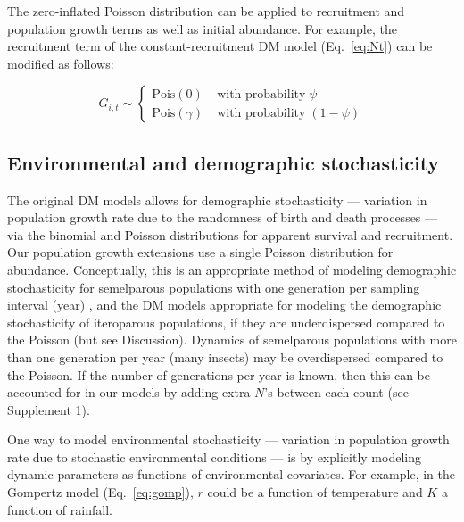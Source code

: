 \documentclass[12pt,english]{article}
\begin{document}
\begin{spacing}{1.9}
\begin{flushleft}
The zero-inflated Poisson distribution can be applied to recruitment and 
population growth terms as well as initial abundance. For example, 
the recruitment term of the constant-recruitment DM model
(Eq.~\ref{eq:Nt}) can be modified as follows:
\begin{linenomath*}
\begin{equation}
G_{i,t} \sim \left\{
\begin{aligned}
\mathrm{Pois}(0) &\; \text{with probability} \; \psi \\
\mathrm{Pois}(\gamma) &\; \text{with probability} \; (1-\psi)\end{aligned} \right.
\label{eq:ZIPts}
\end{equation}
\end{linenomath*}

\subsection*{Environmental and demographic stochasticity}
\label{subsec:stoch}
The original DM models allows for demographic stochasticity --- variation in population growth 
rate due to the randomness of birth and death processes --- 
via the binomial and Poisson distributions for apparent survival and recruitment.  Our population
growth extensions use a single Poisson distribution for abundance. 
Conceptually, this is an appropriate method of modeling demographic stochasticity 
 for semelparous populations with one generation per sampling interval (year)
 \citep{bonsall_hastings:2004},
and the DM models appropriate for modeling the demographic stochasticity of iteroparous populations,
if they are underdispersed compared to the Poisson (but see Discussion).
 Dynamics of semelparous populations with more than one generation per year 
 (many insects) may be overdispersed compared to the Poisson.  If the number of generations per
 year is known, then this can be accounted for in our models by adding extra $N$'s between each
 count (see Supplement 1).

One way to model environmental stochasticity --- variation in population growth
rate due to stochastic environmental conditions --- is by explicitly
modeling dynamic parameters as functions of environmental covariates. 
For example, in the Gompertz model (Eq.~\ref{eq:gomp}), $r$ could be a 
function of temperature  
and $K$ a function of rainfall. 
 

\end{flushleft}
\end{spacing}
\end{document}
